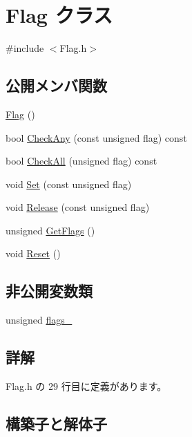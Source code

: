 \hypertarget{class_flag}{}\section{Flag クラス}
\label{class_flag}


{\ttfamily \#include $<$Flag.\+h$>$}

\subsection*{公開メンバ関数}
\begin{DoxyCompactItemize}
\item 
\mbox{\hyperlink{class_flag_a50b074239c14091f2a0dc1f52f9ed230}{Flag}} ()
\item 
bool \mbox{\hyperlink{class_flag_a3efc58733cf4aae0ff1ab0752aa4c702}{Check\+Any}} (const unsigned flag) const
\item 
bool \mbox{\hyperlink{class_flag_ac2ff8a3589aeefcf2672304da6339351}{Check\+All}} (unsigned flag) const
\item 
void \mbox{\hyperlink{class_flag_a362d2f64c03c0b596004f3eba4cb14a3}{Set}} (const unsigned flag)
\item 
void \mbox{\hyperlink{class_flag_a69ac5240829e3f509c64ca28b2344b6d}{Release}} (const unsigned flag)
\item 
unsigned \mbox{\hyperlink{class_flag_a0a2b25c70f1a7d90cd90c595b37ffc2a}{Get\+Flags}} ()
\item 
void \mbox{\hyperlink{class_flag_aef13ac09901558208fa1d8b63549c2ae}{Reset}} ()
\end{DoxyCompactItemize}
\subsection*{非公開変数類}
\begin{DoxyCompactItemize}
\item 
unsigned \mbox{\hyperlink{class_flag_abd957aebe38d770132485740992bc41e}{flags\+\_\+}}
\end{DoxyCompactItemize}


\subsection{詳解}


 Flag.\+h の 29 行目に定義があります。



\subsection{構築子と解体子}
\mbox{\label{class_flag_a50b074239c14091f2a0dc1f52f9ed230}} 
